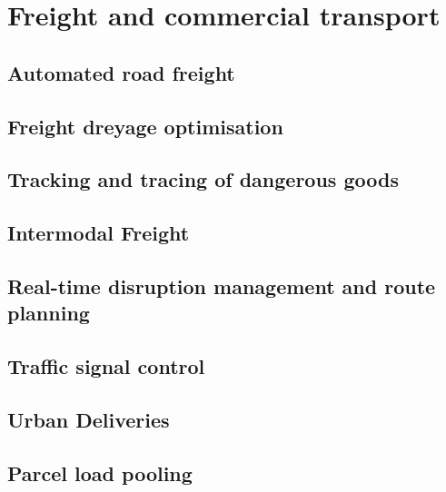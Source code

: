 \documentclass[
]{book}
\begin{document}
\hypertarget{freight}{%
\chapter{Freight and commercial transport}\label{freight}}

\hypertarget{automated-road-freight}{%
\section{Automated road freight}\label{automated-road-freight}}

\hypertarget{freight-dreyage-optimisation}{%
\section{Freight dreyage optimisation}\label{freight-dreyage-optimisation}}

\hypertarget{tracking-and-tracing-of-dangerous-goods}{%
\section{Tracking and tracing of dangerous goods}\label{tracking-and-tracing-of-dangerous-goods}}

\hypertarget{intermodal-freight}{%
\section{Intermodal Freight}\label{intermodal-freight}}

\hypertarget{real-time-disruption-management-and-route-planning}{%
\section{Real-time disruption management and route planning}\label{real-time-disruption-management-and-route-planning}}

\hypertarget{traffic-signal-control}{%
\section{Traffic signal control}\label{traffic-signal-control}}

\hypertarget{urban-deliveries}{%
\section{Urban Deliveries}\label{urban-deliveries}}

\hypertarget{parcel-load-pooling}{%
\section{Parcel load pooling}\label{parcel-load-pooling}}
\end{document}
